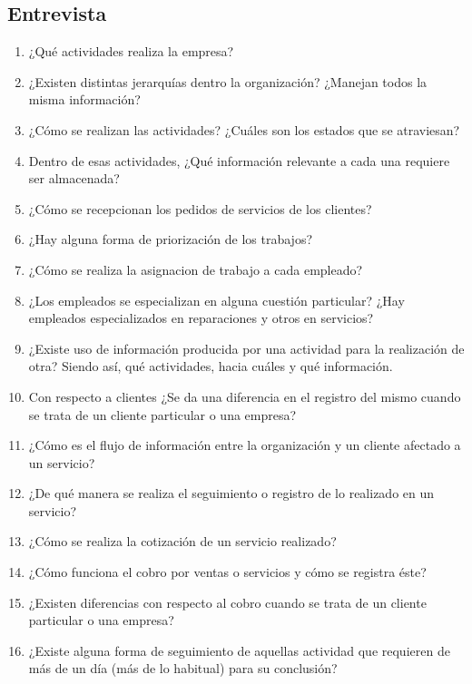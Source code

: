 \documentclass[12pt]{extarticle}
\begin{document}
    \begin{spacing}{1.2}



    \section{Entrevista}
    \begin{enumerate}
        \item ¿Qué actividades realiza la empresa?
        \item ¿Existen distintas jerarquías dentro la organización? ¿Manejan todos la misma información?
        \item ¿Cómo se realizan las actividades? ¿Cuáles son los estados que se atraviesan?
        \item Dentro de esas actividades, ¿Qué información relevante a cada una requiere ser almacenada?
        \item ¿Cómo se recepcionan los pedidos de servicios de los clientes?
        \item ¿Hay alguna forma de priorización de los trabajos?
        \item ¿Cómo se realiza la asignacion de trabajo a cada empleado? 
        \item ¿Los empleados se especializan en alguna cuestión particular? ¿Hay empleados especializados en reparaciones y otros en servicios? 
        \item ¿Existe uso de información producida por una actividad para la realización de otra? Siendo así, qué actividades, hacia cuáles y qué información.
        \item Con respecto a clientes ¿Se da una diferencia en el registro del mismo cuando se trata de un cliente particular o una empresa?
        \item ¿Cómo es el flujo de información entre la organización y un cliente afectado a un servicio?
        \item ¿De qué manera se realiza el seguimiento o registro de lo realizado en un servicio?
        \item ¿Cómo se realiza la cotización de un servicio realizado?
        \item ¿Cómo funciona el cobro por ventas o servicios y cómo se registra éste?
        \item ¿Existen diferencias con respecto al cobro cuando se trata de un cliente particular o una empresa?
        \item ¿Existe alguna forma de seguimiento de aquellas actividad que requieren de más de un día (más de lo habitual) para su conclusión?

\end{enumerate}
\end{spacing}
\end{document}
